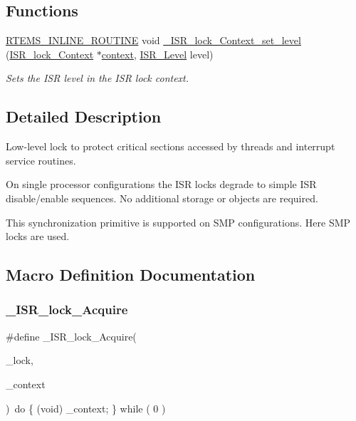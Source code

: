 \subsection*{Functions}
\begin{DoxyCompactItemize}
\item 
\mbox{\hyperlink{group__RTEMSScoreBaseDefs_gac216239df231d5dbd15e3520b0b9313f}{R\+T\+E\+M\+S\+\_\+\+I\+N\+L\+I\+N\+E\+\_\+\+R\+O\+U\+T\+I\+NE}} void \mbox{\hyperlink{group__RTEMSScoreISRLocks_ga937f2866844702a8e85148bcdc4d49d0}{\+\_\+\+I\+S\+R\+\_\+lock\+\_\+\+Context\+\_\+set\+\_\+level}} (\mbox{\hyperlink{structISR__lock__Context}{I\+S\+R\+\_\+lock\+\_\+\+Context}} $\ast$\mbox{\hyperlink{sun4u_2tte_8h_a9b4a99475e2709333b8e5d70483173f1}{context}}, \mbox{\hyperlink{group__RTEMSScoreISR_gad1af728587ebcefec5b5cf94fc7909b9}{I\+S\+R\+\_\+\+Level}} level)
\begin{DoxyCompactList}\small\item\em Sets the I\+SR level in the I\+SR lock context. \end{DoxyCompactList}\end{DoxyCompactItemize}


\subsection{Detailed Description}
Low-\/level lock to protect critical sections accessed by threads and interrupt service routines. 

On single processor configurations the I\+SR locks degrade to simple I\+SR disable/enable sequences. No additional storage or objects are required.

This synchronization primitive is supported on S\+MP configurations. Here S\+MP locks are used. 

\subsection{Macro Definition Documentation}
\mbox{\label{group__RTEMSScoreISRLocks_ga69700d5284dea5b4ce06b5ebc405d797}} 
\subsubsection{\texorpdfstring{\_ISR\_lock\_Acquire}{\_ISR\_lock\_Acquire}}
{\footnotesize\ttfamily \#define \+\_\+\+I\+S\+R\+\_\+lock\+\_\+\+Acquire(\begin{DoxyParamCaption}\item[{}]{\+\_\+lock,  }\item[{}]{\+\_\+context }\end{DoxyParamCaption})~do \{ (void) \+\_\+context; \} while ( 0 )}




